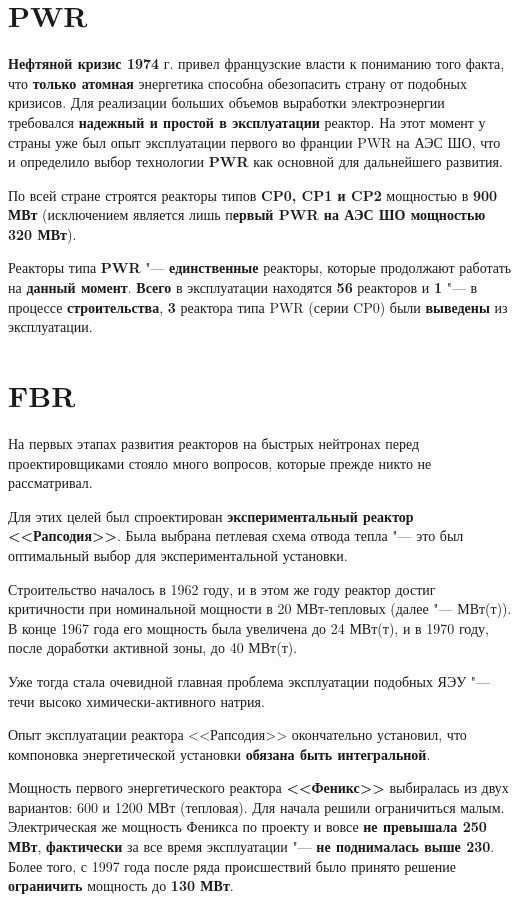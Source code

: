 \section{PWR}

\textbf{Нефтяной кризис 1974} г. привел французские власти к пониманию
того факта, что \textbf{только атомная} энергетика способна обезопасить
страну от подобных кризисов. Для реализации больших объемов выработки электроэнергии требовался \textbf{надежный и простой в эксплуатации} реактор. На этот момент у страны уже был опыт эксплуатации первого во франции PWR на АЭС ШО, что и определило выбор технологии \textbf{PWR} как основной для дальнейшего развития.

По всей стране строятся реакторы типов \textbf{CP0, CP1 и CP2} мощностью в \textbf{900 МВт} (исключением является лишь п\textbf{ервый PWR на АЭС ШО мощностью 320 МВт}).

Реакторы типа \textbf{PWR} "--- \textbf{единственные} реакторы, которые продолжают работать на \textbf{данный момент}. \textbf{Всего} в эксплуатации находятся \textbf{56} реакторов и \textbf{1} "--- в процессе \textbf{строительства}, \textbf{3} реактора типа PWR (серии CP0) были \textbf{выведены} из эксплуатации.

\section{FBR}

На первых этапах развития реакторов на быстрых нейтронах перед проектировщиками стояло много вопросов, которые прежде никто не рассматривал. 

Для этих целей был спроектирован \textbf{экспериментальный реактор <<Рапсодия>>}. Была выбрана петлевая схема отвода тепла "--- это был оптимальный выбор для экспериментальной установки.

Строительство началось в 1962 году, и в этом же году реактор достиг критичности при номинальной мощности в 20 МВт-тепловых (далее "--- МВт(т)). В конце 1967 года его мощность была увеличена до 24 МВт(т), и в 1970 году, после доработки активной зоны, до 40 МВт(т).

Уже тогда стала очевидной главная проблема эксплуатации подобных ЯЭУ "--- течи высоко химически-активного натрия.

Опыт эксплуатации реактора <<Рапсодия>> окончательно установил, что компоновка энергетической установки \textbf{обязана быть интегральной}.

Мощность первого энергетического реактора \textbf{<<Феникс>>} выбиралась из двух вариантов: 600 и 1200 МВт (тепловая). Для начала решили ограничиться малым. Электрическая же мощность Феникса по проекту и вовсе \textbf{не превышала 250 МВт}, \textbf{фактически} за все время эксплуатации "--- \textbf{не поднималась выше 230}. Более того, с 1997 года после ряда происшествий было принято решение \textbf{ограничить} мощность до \textbf{130 МВт}. 

